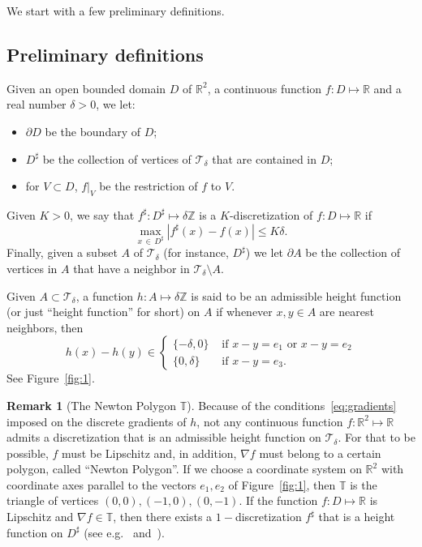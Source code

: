 \documentclass[10pt]{amsart}
\theoremstyle{definition}\newtheorem{defi}[theo]{Definition}\newtheorem{rema}[theo]{Remark}\newtheorem{exam}[theo]{Example}\newtheorem{exem}[theo]{Example}\newtheorem{nota}[theo]{Notation}
\newcommand{\R}{\mathbb{R}}
\newcommand{\Z}{\mathbb{Z}}
\newcommand{\bbT}{\mathbb{T}}
\newcommand{\clT}{\mathcal{T}}
\renewcommand{\d}{{\sharp }}
\begin{document}
We start with a few preliminary definitions.
\subsection{Preliminary definitions}\label{sec:somenot}
Given an open bounded domain $D$ of $\R^2$, a continuous function $f:D\mapsto \R$ and a real number $\delta>0$, we let:
\begin{itemize}
\item $\partial D$ be the boundary of $D$;
\item $D^{\sharp}$ be the collection of vertices of $\clT_\delta$ that are contained in $D$;
\item for $V\subset D$, $f|_V$ be the restriction of $f$ to $V$.
\end{itemize}

Given $K>0$, we say that $f^{\d}:D^{\d}\mapsto \delta \Z$ is a $K$-discretization of $f:D\mapsto \R$ if
\begin{equation}
\max_{x\,\in\,D^\d}\left|f^\d(x)-f(x)\right|\le K\delta.
\end{equation}
Finally, given a subset $A$ of $\clT_\delta$ (for instance, $D^\d$) we let $\partial A$ be the collection of vertices in $A$ that have a neighbor in $\clT_\delta\setminus A$.

Given $A\subset \clT_\delta$, a function $h:A\mapsto \delta \Z$ is said to be an admissible height function (or just ``height function'' for short) on $A$ if whenever $x,y\in A$ are nearest neighbors, then
\begin{equation}\label{eq:gradients}
h(x)-h(y) \in
\begin{cases}
\{-\delta, 0\} &\text{ if } x-y=e_1 \text{ or } x-y=e_2\\
\{0, \delta\} & \text{ if } x-y=e_3.
\end{cases}
\end{equation}
See Figure~\ref{fig:1}.

\begin{rema}[The Newton Polygon $\bbT$]Because of the conditions~\eqref{eq:gradients} imposed on the discrete gradients of $h$, not any continuous function $f:\R^2\mapsto \R$ admits a discretization
that is an admissible height function on $\clT_\delta$. For that to be possible, $f$ must be Lipschitz and, in addition, $\nabla f$ must belong to a certain polygon, called ``Newton Polygon''. If we choose a coordinate system on $\R^2$ with coordinate axes parallel to the vectors $e_1,e_2$ of Figure~\ref{fig:1}, then $\bbT$ is the triangle of vertices $(0,0),(-1,0),(0,-1)$. If the function $f:D\mapsto \R$ is Lipschitz and $\nabla f\in \bbT$, then there exists a $1-$discretization $f^\d$ that is a height function on $D^\d$ (see e.g.~\cite[Sec.~2.1]{LT_cmp} and~\cite[Sec.~2.5.4]{LT_ptrf}). \label{rem:T}
\end{rema}
\end{document}
